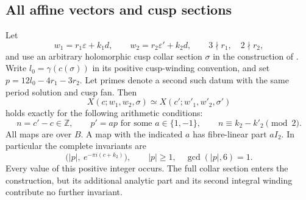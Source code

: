 \subsection{All affine vectors and cusp sections}\label{fam:section:B.2}

\begin{proposition}\label{fam:src:B.2.1}\label{fam:st:B.2.1}
Let
\[
 w_1=r_1\varepsilon+k_1d,\qquad w_2=r_2\varepsilon'+k_2d,
 \qquad 3\nmid r_1,\quad 2\nmid r_2,
\]
and use an arbitrary holomorphic cusp collar section $\sigma$ in the construction of \cite[Section 6.4]{AC2026}. Write $l_0=\gamma(c(\sigma))$ in its positive cusp-winding convention, and set $p=12l_0-4r_1-3r_2$. Let primes denote a second such datum with the same period solution and cusp fan. Then
\[
 X(c;w_1,w_2,\sigma)\simeq X(c';w'_1,w'_2,\sigma')
\]
holds exactly for the following arithmetic conditions:
\[
 n=c'-c\in\mathbb Z,\qquad
 p'=a p\text{ for some }a\in\{1,-1\},\qquad
 n\equiv k_2-k'_2\pmod2.
\]
All maps are over $B$. A map with the indicated $a$ has fibre-linear part $aI_2$. In particular the complete invariants are
\[
 \bigl(|p|,\ e^{-\pi i(c+k_2)}\bigr),\qquad
 |p|\ge1,\quad\gcd(|p|,6)=1.
\]
Every value of this positive integer occurs. The full collar section enters the construction, but its additional analytic part and its second integral winding contribute no further invariant.
\end{proposition}

